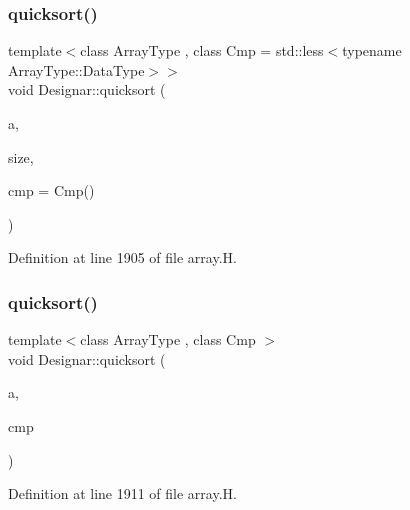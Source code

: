 \mbox{\label{namespace_designar_a3b84da2b14868b20993ec9687e3c29c4}} 
\subsubsection{\texorpdfstring{quicksort()}{quicksort()}\hspace{0.1cm}{\footnotesize\ttfamily [12/14]}}
{\footnotesize\ttfamily template$<$class Array\+Type , class Cmp  = std\+::less$<$typename Array\+Type\+::\+Data\+Type$>$$>$ \\
void Designar\+::quicksort (\begin{DoxyParamCaption}\item[{Array\+Type \&}]{a,  }\item[{\hyperlink{namespace_designar_a9d113d66a39e82b73727c72cd3a52f73}{lint\+\_\+t}}]{size,  }\item[{Cmp \&\&}]{cmp = {\ttfamily Cmp()} }\end{DoxyParamCaption})\hspace{0.3cm}{\ttfamily [inline]}}



Definition at line 1905 of file array.\+H.

\mbox{\label{namespace_designar_ae6156420cc82f38302cc7b7c837275b1}} 
\subsubsection{\texorpdfstring{quicksort()}{quicksort()}\hspace{0.1cm}{\footnotesize\ttfamily [13/14]}}
{\footnotesize\ttfamily template$<$class Array\+Type , class Cmp $>$ \\
void Designar\+::quicksort (\begin{DoxyParamCaption}\item[{Array\+Type \&}]{a,  }\item[{Cmp \&}]{cmp }\end{DoxyParamCaption})\hspace{0.3cm}{\ttfamily [inline]}}



Definition at line 1911 of file array.\+H.

\mbox{\label{namespace_designar_a75b9270f723888eb32e0b8f78032f0df}} 
